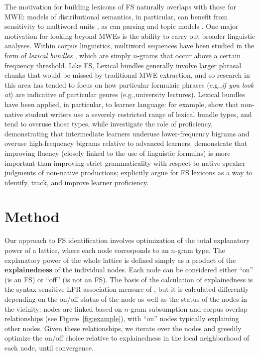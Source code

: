\documentclass[11pt,letterpaper]{article}
\makeatletter
\def \eg {e.g.,\@ }
\newcommand{\termdef}[1]{\textbf{#1}\xspace}
\newcommand{\figref}[2][]{Figure#1~\ref{#2}\xspace}
\makeatother
\begin{document}
The motivation for building lexicons of FS naturally overlaps with those for MWE: models of distributional semantics, in particular, can benefit from sensitivity to multiword units \cite{Cohen:Widdows:2009}, as can parsing \cite{Constant16} and topic models \cite{Lau+:2012b}. One major motivation for looking beyond MWEs is the ability to carry out broader linguistic analyses. Within corpus linguistics, multiword sequences have been studied in the form of \textit{lexical bundles} \cite{Biber04}, which are simply $n$-grams that occur above a certain frequency threshold. Like FS, Lexical bundles generally involve larger phrasal chunks that would be missed by traditional MWE extraction, and so research in this area has tended to focus on how particular formulaic phrases (\eg \textit{if you look at}) are indicative of particular genres (\eg university lectures). Lexical bundles have been applied, in particular, to learner language: for example,   show that non-native student writers use a severely restricted range of lexical bundle types, and tend to overuse those types, while  investigate the role of proficiency, demonstrating that intermediate learners underuse lower-frequency bigrams and overuse high-frequency bigrams relative to advanced learners.  demonstrate that improving fluency (closely linked to the use of linguistic formulas) is more important than improving strict grammaticality with respect to native speaker judgments of non-native productions;  explicitly argue for FS lexicons as a way to identify, track, and improve learner proficiency.


\section{Method}

Our approach to FS identification involves optimization of the total explanatory power of a lattice, where each node corresponds to an $n$-gram type. The explanatory power of the whole lattice is defined simply as a product of the \termdef{explainedness} of the individual nodes. Each node can be considered either ``on'' (is an FS) or ``off'' (is not an FS). The basis of the calculation of explainedness is the syntax-sensitive LPR association measure of , but it is calculated differently depending on the on/off status of the node as well as the status of the nodes in the vicinity: nodes are linked based on $n$-gram subsumption and corpus overlap relationships (see \figref{fig:example}), with ``on'' nodes typically explaining other nodes.  Given these relationships, we iterate over the nodes and greedily optimize the on/off choice relative to explainedness in the local neighborhood of each node, until convergence.
\end{document}

